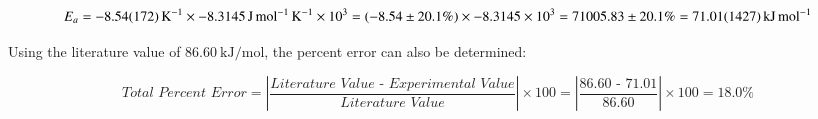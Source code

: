  \[E_a = \SI{-8.54\pm1.72}{\per\kelvin} \times -\SI{8.3145}{\joule\per\mole\per\kelvin} \times 10^3 = (-8.54 \pm 20.1\%) \times -8.3145 \times 10^3 = 71005.83 \pm 20.1\% = \SI{71.01\pm14.27}{\kilo\joule\per\mole}\]

 Using the literature value of $\SI{86.60}{\kilo\joule\per\mole}$, the percent error can also be determined:

 \[\textit{Total Percent Error} = \left|\frac{\textit{Literature Value - Experimental Value}}{\textit{Literature Value}}\right| \times 100 = \left|\frac{\textit{86.60 - 71.01}}{\textit{86.60}}\right| \times 100 = 18.0\%\]



